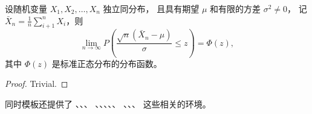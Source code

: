 \begin{theorem}
  设随机变量 $X_1, X_2, \dots, X_n$ 独立同分布， 且具有期望 $\mu$ 和有限的方差 $\sigma^2 \ne 0$，
  记 $\bar{X}_n = \frac{1}{n} \sum_{i+1}^n X_i$，则
  \begin{equation}
    \lim_{n \to \infty} P \left(\frac{\sqrt{n} \left( \bar{X}_n - \mu \right)}{\sigma} \le z \right) = \Phi(z),
  \end{equation}
  其中 $\Phi(z)$ 是标准正态分布的分布函数。
\end{theorem}
\begin{proof}
  Trivial.
\end{proof}

同时模板还提供了 、、、
、、、、、
、、、 这些相关的环境。
